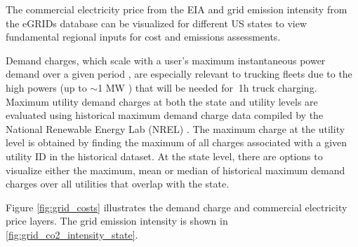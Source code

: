 The commercial electricity price from the EIA \cite{EIA_2024} and grid emission intensity from the eGRIDs database \cite{eGRID_2022} can be visualized for different US states to view fundamental regional inputs for cost and emissions assessments. 

Demand charges, which scale with a user's maximum instantaneous power demand over a given period \cite{FEMP_DemandCharge}, are especially relevant to trucking fleets due to the high powers (up to $\sim$1 MW \cite{Moorthy_2022}) that will be needed for $~$1h truck charging. Maximum utility demand charges at both the state and utility levels are evaluated using historical maximum demand charge data compiled by the National Renewable Energy Lab (NREL) \cite{McLaren_2017}. The maximum charge at the utility level is obtained by finding the maximum of all charges associated with a given utility ID in the historical dataset. At the state level, there are options to visualize either the maximum, mean or median of historical maximum demand charges over all utilities that overlap with the state. 

Figure \ref{fig:grid_costs} illustrates the demand charge and commercial electricity price layers. The grid emission intensity is shown in \ref{fig:grid_co2_intensity_state}.


